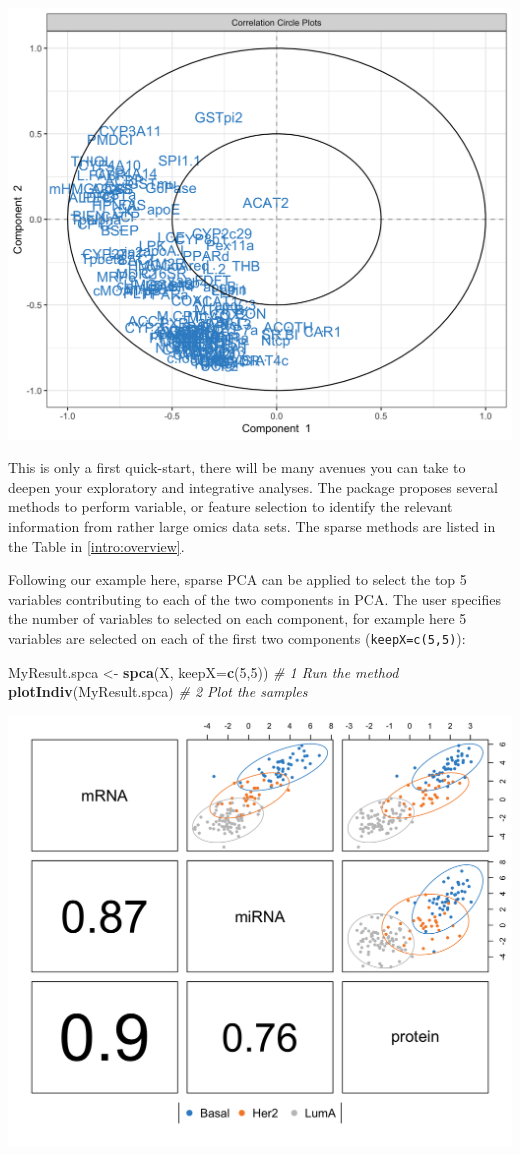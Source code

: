 \documentclass[]{book}
\newenvironment{Shaded}{\begin{snugshade}}{\end{snugshade}}
\newcommand{\KeywordTok}[1]{\textcolor[rgb]{0.13,0.29,0.53}{\textbf{#1}}}
\newcommand{\DataTypeTok}[1]{\textcolor[rgb]{0.13,0.29,0.53}{#1}}
\newcommand{\DecValTok}[1]{\textcolor[rgb]{0.00,0.00,0.81}{#1}}
\newcommand{\StringTok}[1]{\textcolor[rgb]{0.31,0.60,0.02}{#1}}
\newcommand{\CommentTok}[1]{\textcolor[rgb]{0.56,0.35,0.01}{\textit{#1}}}
\newcommand{\NormalTok}[1]{#1}
\theoremstyle{definition}
\theoremstyle{definition}
\theoremstyle{definition}
\theoremstyle{remark}
\begin{document}
\begin{center}\includegraphics[width=0.5\linewidth]{Figures/unnamed-chunk-5-2} \end{center}

This is only a first quick-start, there will be many avenues you can
take to deepen your exploratory and integrative analyses. The package
proposes several methods to perform variable, or feature selection to
identify the relevant information from rather large omics data sets. The
sparse methods are listed in the Table in \ref{intro:overview}.

Following our example here, sparse PCA can be applied to select the top
5 variables contributing to each of the two components in PCA. The user
specifies the number of variables to selected on each component, for
example here 5 variables are selected on each of the first two
components (\texttt{keepX=c(5,5)}):

\begin{Shaded}
\begin{Highlighting}[]
\NormalTok{MyResult.spca <-}\StringTok{ }\KeywordTok{spca}\NormalTok{(X, }\DataTypeTok{keepX=}\KeywordTok{c}\NormalTok{(}\DecValTok{5}\NormalTok{,}\DecValTok{5}\NormalTok{)) }\CommentTok{# 1 Run the method}
\KeywordTok{plotIndiv}\NormalTok{(MyResult.spca)               }\CommentTok{# 2 Plot the samples}
\end{Highlighting}
\end{Shaded}

\begin{center}\includegraphics[width=0.5\linewidth]{Figures/unnamed-chunk-6-1} \end{center}
\end{document}
